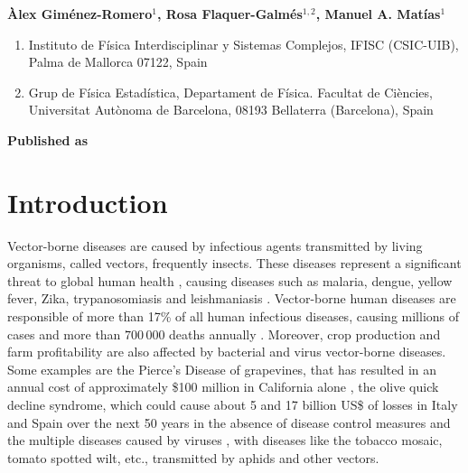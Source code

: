 \vspace{1cm}

\textbf{Àlex Giménez-Romero$^{1}$, Rosa Flaquer-Galmés$^{1,2}$, Manuel A.
    Matías$^{1}$}

\vspace{1cm}

\begin{enumerate}
    \small
    \item Instituto de Física Interdisciplinar y Sistemas Complejos, IFISC
          (CSIC-UIB), Palma de Mallorca 07122, Spain
    \item Grup de Física Estadística, Departament de Física. Facultat de
          Ciències, Universitat Autònoma de Barcelona, 08193 Bellaterra
          (Barcelona),
          Spain

\end{enumerate}

\vspace{1cm}

\textbf{Published as}

\vspace{0.5cm}


\newpage
\section{Introduction}\label{sec:intro}

Vector-borne diseases are caused by infectious agents transmitted by living
organisms, called vectors,  frequently insects. These diseases represent a
significant threat to global human health \cite{Athni_2020}, causing diseases
such as malaria, dengue, yellow fever, Zika, trypanosomiasis and leishmaniasis
\cite{SCHUMACHER2018352}. Vector-borne human diseases are responsible of more
than 17\% of all human infectious diseases, causing millions of cases and more
than $700\,000$ deaths annually \cite{WHO}. Moreover, crop production and farm
profitability are also affected by bacterial \cite{HUANG20201379} and virus
\cite{Bragard2013} vector-borne diseases. Some examples are the Pierce's
Disease of grapevines, that has resulted in an annual cost of approximately
\$100 million in California alone \cite{tumber2014pierce}, the olive quick
decline syndrome, which could cause about 5 and 17 billion US\$ of losses in
Italy and Spain over the next 50 years in the absence of disease control
measures \cite{Schneider2020} and the multiple diseases caused by viruses
\cite{Rybicki2015}, with diseases like the tobacco mosaic, tomato spotted
wilt, etc., transmitted by aphids and other vectors.

